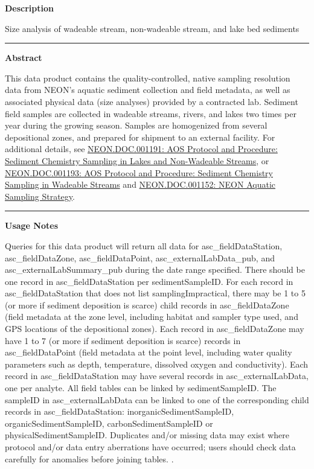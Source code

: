 \documentclass[]{article}
\begin{document}
\textbf{Description}

Size analysis of wadeable stream, non-wadeable stream, and lake bed
sediments

\begin{center}\rule{0.5\linewidth}{\linethickness}\end{center}

\textbf{Abstract}

This data product contains the quality-controlled, native sampling
resolution data from NEON's aquatic sediment collection and field
metadata, as well as associated physical data (size analyses) provided
by a contracted lab. Sediment field samples are collected in wadeable
streams, rivers, and lakes two times per year during the growing season.
Samples are homogenized from several depositional zones, and prepared
for shipment to an external facility. For additional details, see
\href{http://data.neonscience.org/api/v0/documents/NEON.DOC.001191vD}{NEON.DOC.001191:
AOS Protocol and Procedure: Sediment Chemistry Sampling in Lakes and
Non-Wadeable Streams}, or
\href{http://data.neonscience.org/api/v0/documents/NEON.DOC.001193vE}{NEON.DOC.001193:
AOS Protocol and Procedure: Sediment Chemistry Sampling in Wadeable
Streams} and
\href{http://data.neonscience.org/api/v0/documents/NEON.DOC.001152vA}{NEON.DOC.001152:
NEON Aquatic Sampling Strategy}.

\begin{center}\rule{0.5\linewidth}{\linethickness}\end{center}

\textbf{Usage Notes}

Queries for this data product will return all data for
asc\_fieldDataStation, asc\_fieldDataZone, asc\_fieldDataPoint,
asc\_externalLabData\_pub, and asc\_externalLabSummary\_pub during the
date range specified. There should be one record in
asc\_fieldDataStation per sedimentSampleID. For each record in
asc\_fieldDataStation that does not list samplingImpractical, there may
be 1 to 5 (or more if sediment deposition is scarce) child records in
asc\_fieldDataZone (field metadata at the zone level, including habitat
and sampler type used, and GPS locations of the depositional zones).
Each record in asc\_fieldDataZone may have 1 to 7 (or more if sediment
deposition is scarce) records in asc\_fieldDataPoint (field metadata at
the point level, including water quality parameters such as depth,
temperature, dissolved oxygen and conductivity). Each record in
asc\_fieldDataStation may have several records in asc\_externalLabData,
one per analyte. All field tables can be linked by sedimentSampleID. The
sampleID in asc\_externalLabData can be linked to one of the
corresponding child records in asc\_fieldDataStation:
inorganicSedimentSampleID, organicSedimentSampleID,
carbonSedimentSampleID or physicalSedimentSampleID. Duplicates and/or
missing data may exist where protocol and/or data entry aberrations have
occurred; users should check data carefully for anomalies before joining
tables. \newpage
.
\end{document}
